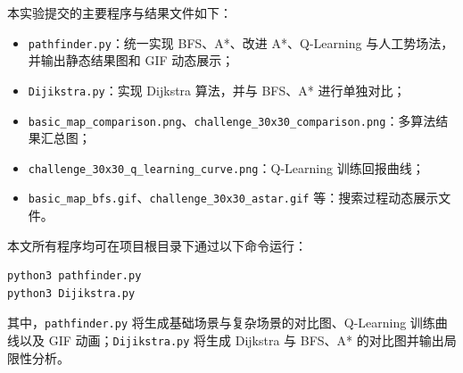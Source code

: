 \label{sec:appendix-files}

本实验提交的主要程序与结果文件如下：

\begin{itemize}
  \item \texttt{pathfinder.py}：统一实现 BFS、A*、改进 A*、Q-Learning 与人工势场法，并输出静态结果图和 GIF 动态展示；
  \item \texttt{Dijikstra.py}：实现 Dijkstra 算法，并与 BFS、A* 进行单独对比；
  \item \texttt{basic\_map\_comparison.png}、\texttt{challenge\_30x30\_comparison.png}：多算法结果汇总图；
  \item \texttt{challenge\_30x30\_q\_learning\_curve.png}：Q-Learning 训练回报曲线；
  \item \texttt{basic\_map\_bfs.gif}、\texttt{challenge\_30x30\_astar.gif} 等：搜索过程动态展示文件。
\end{itemize}


本文所有程序均可在项目根目录下通过以下命令运行：

\begin{verbatim}
python3 pathfinder.py
python3 Dijikstra.py
\end{verbatim}

其中，\texttt{pathfinder.py} 将生成基础场景与复杂场景的对比图、Q-Learning 训练曲线以及 GIF 动画；\texttt{Dijikstra.py} 将生成 Dijkstra 与 BFS、A* 的对比图并输出局限性分析。
